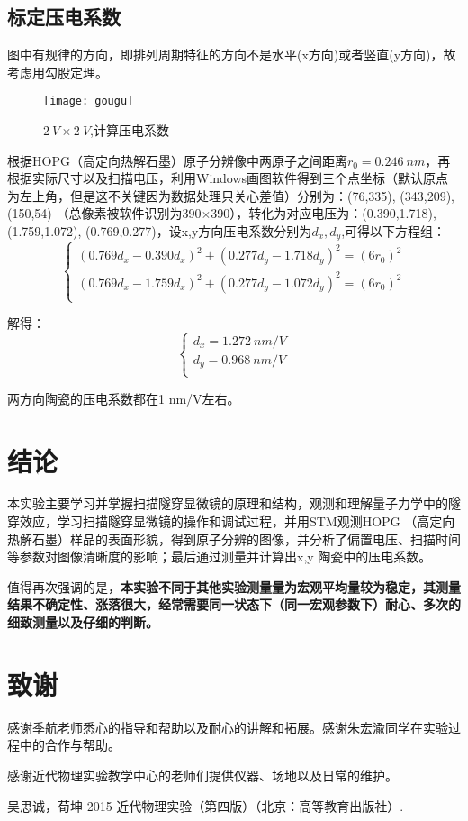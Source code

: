 \documentclass[aps,pre,12pt,preprint,onecolumn,showpacs,showkeys]{revtex4-1}
\begin{document}
\subsection{标定压电系数}
图中有规律的方向，即排列周期特征的方向不是水平(x方向)或者竖直(y方向)，故考虑用勾股定理。
\begin{figure}[H]
\centering
\texttt{[image: gougu]}
\centering
\caption{\label{fig:图9}%
$2\ V\times2\ V$,计算压电系数}
\end{figure}
根据HOPG（高定向热解石墨）原子分辨像中两原子之间距离$r_0=0.246\ nm$，再根据实际尺寸以及扫描电压，利用Windows画图软件得到三个点坐标（默认原点为左上角，但是这不关键因为数据处理只关心差值）分别为：(76,335), (343,209), (150,54) （总像素被软件识别为390$\times$390），转化为对应电压为：(0.390,1.718), (1.759,1.072), (0.769,0.277)，设x,y方向压电系数分别为$d_x,d_y$,可得以下方程组：
\begin{equation}
\begin{cases}
(0.769d_x-0.390d_x)^2+(0.277d_y-1.718d_y)^2=(6r_0)^2\\
(0.769d_x-1.759d_x)^2+(0.277d_y-1.072d_y)^2=(6r_0)^2\\
\end{cases}
\end{equation}

解得：
\begin{equation}
\begin{cases}
d_x = 1.272\ nm/V\\
d_y = 0.968\ nm/V\\
\end{cases}
\end{equation}

两方向陶瓷的压电系数都在1 nm/V左右。



\section{结论}
本实验主要学习并掌握扫描隧穿显微镜的原理和结构，观测和理解量子力学中的隧穿效应，学习扫描隧穿显微镜的操作和调试过程，并用STM观测HOPG （高定向热解石墨）样品的表面形貌，得到原子分辨的图像，并分析了偏置电压、扫描时间等参数对图像清晰度的影响；最后通过测量并计算出x,y 陶瓷中的压电系数。\par
值得再次强调的是，\textbf{本实验不同于其他实验测量量为宏观平均量较为稳定，其测量结果不确定性、涨落很大，经常需要同一状态下（同一宏观参数下）耐心、多次的细致测量以及仔细的判断。}

\section{致谢}
感谢季航老师悉心的指导和帮助以及耐心的讲解和拓展。感谢朱宏渝同学在实验过程中的合作与帮助。\par
感谢近代物理实验教学中心的老师们提供仪器、场地以及日常的维护。\par
%
\begin{thebibliography}{}
 吴思诚，荀坤 2015 近代物理实验（第四版）（北京：高等教育出版社）.
\end{thebibliography}
\end{document}
